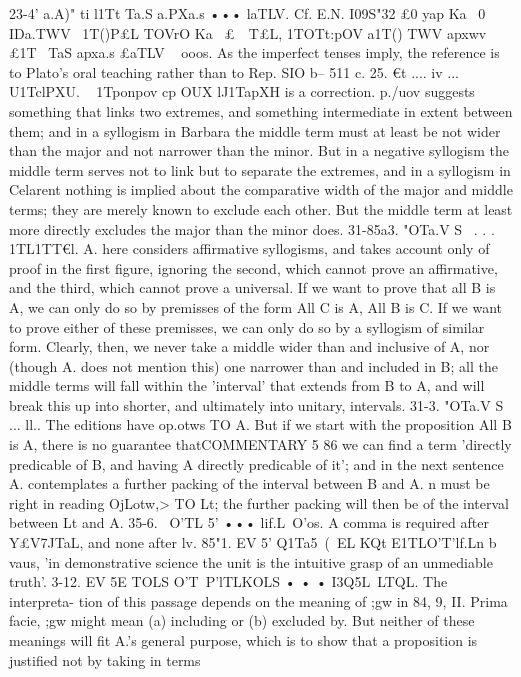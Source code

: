 {{{{{{{{{{{{{{{{{{{{{{{{{{{{{{23-4' a.A)" ti l1Tt Ta.S a.PXa.s ••• laTLV. Cf. E.N. I09S"32 £0 yap
Ka~ 0 IDa.TWV ~1T()P£L TOVrO Ka~ £~~T£L, 1TOTt:pOV a1T() TWV apxwv ~
£1T~ TaS apxa.s £aTLV ~ ooos. As the imperfect tenses imply, the
reference is to Plato's oral teaching rather than to Rep. SIO b--
511 c.
25. €t .... iv ... U1TclPXU. ~ 1Tponpov cp OUX lJ1TapXH is a correction.
p./uov suggests something that links two extremes, and something
intermediate in extent between them; and in a syllogism in
Barbara the middle term must at least be not wider than the
major and not narrower than the minor. But in a negative
syllogism the middle term serves not to link but to separate the
extremes, and in a syllogism in Celarent nothing is implied about
the comparative width of the major and middle terms; they are
merely known to exclude each other. But the middle term at
least more directly excludes the major than the minor does.
31-85a3. "OTa.V S~ . . . 1TL1TT€l. A. here considers affirmative
syllogisms, and takes account only of proof in the first figure,
ignoring the second, which cannot prove an affirmative, and the
third, which cannot prove a universal. If we want to prove that
all B is A, we can only do so by premisses of the form All C is
A, All B is C. If we want to prove either of these premisses, we
can only do so by a syllogism of similar form. Clearly, then, we
never take a middle wider than and inclusive of A, nor (though
A. does not mention this) one narrower than and included in B;
all the middle terms will fall within the 'interval' that extends
from B to A, and will break this up into shorter, and ultimately
into unitary, intervals.
31-3. "OTa.V S~ ... ll.. The editions have op.otws TO A. But if
we start with the proposition All B is A, there is no guarantee thatCOMMENTARY
5 86
we can find a term 'directly predicable of B, and having A directly
predicable of it'; and in the next sentence A. contemplates a
further packing of the interval between B and A. n must be
right in reading OjLotw,> TO Lt; the further packing will then be
of the interval between Lt and A.
35-6. ~O'TL 5' ••• lif.L~O'os. A comma is required after Y£V7JTaL,
and none after lv.
85"1. EV 5' Q1Ta5~(~EL KQt E1TLO'T'lf.Ln b vaus, 'in demonstrative
science the unit is the intuitive grasp of an unmediable truth'.
3-12. EV 5E TOLS O'T~P'lTLKOLS • • • I3Q5L~LTQL. The interpreta-
tion of this passage depends on the meaning of ;gw in 84, 9, II.
Prima facie, ;gw might mean (a) including or (b) excluded by.
But neither of these meanings will fit A.'s general purpose, which
is to show that a proposition is justified not by taking in terms
}}}}}}}}}}}}}}}}}}}}}}}}}}}}}}
